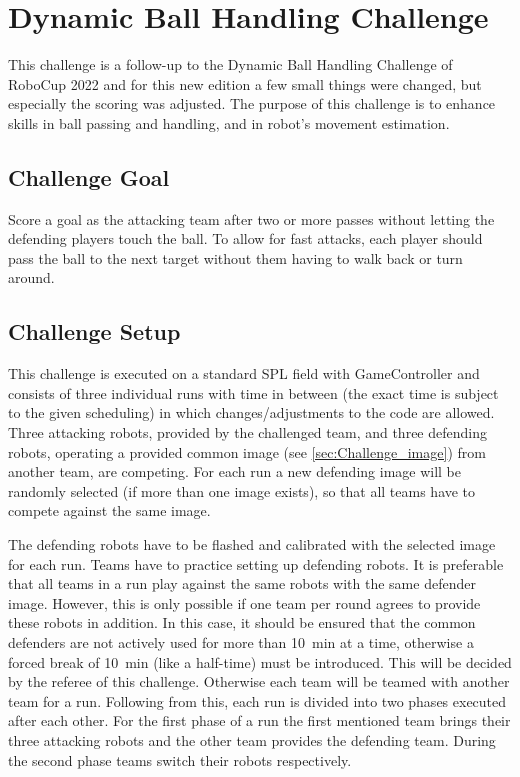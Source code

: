 \section{Dynamic Ball Handling Challenge}

This challenge is a follow-up to the Dynamic Ball Handling Challenge of RoboCup 2022 and for this new edition a few small things were changed, but especially the scoring was adjusted. The purpose of this challenge is to enhance skills in ball passing and handling, and in robot's movement estimation.  

\subsection{Challenge Goal}

Score a goal as the attacking team after two or more passes without letting the defending players touch the ball. To allow for fast attacks, each player should pass the ball to the next target without them having to walk back or turn around.

\subsection{Challenge Setup}

This challenge is executed on a standard SPL field with GameController and consists of three individual runs with time in between (the exact time is subject to the given scheduling) in which changes/adjustments to the code are allowed. Three attacking robots, provided by the challenged team, and three defending robots, operating a provided common image (see \cref{sec:Challenge_image}) from another team, are competing. For each run a new defending image will be randomly selected (if more than one image exists), so that all teams have to compete against the same image.

The defending robots have to be flashed and calibrated with the selected image for each run. Teams have to practice setting up defending robots.
It is preferable that all teams in a run play against the same robots with the same defender image. However, this is only possible if one team per round agrees to provide these robots in addition. In this case, it should be ensured that the common defenders are not actively used for more than \qty{10}{\minute} at a time, otherwise a forced break of \qty{10}{\minute} (like a half-time) must be introduced. This will be decided by the referee of this challenge.
Otherwise each team will be teamed with another team for a run. Following from this, each run is divided into two phases executed after each other. For the first phase of a run the first mentioned team brings their three attacking robots and the other team provides the defending team. During the second phase teams switch their robots respectively. 

